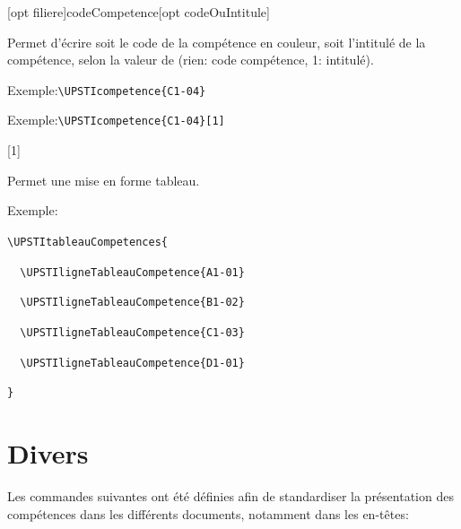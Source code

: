 \documentclass[11pt]{ltxdockit}[2010/09/26]
\newcommand{\ex}{\noindent Exemple:\quad}
\begin{document}
\vspace{1em}
\begin{ltxsyntax}
[opt filiere]{codeCompetence}[opt codeOuIntitule]
\end{ltxsyntax}

\noindent Permet d'écrire soit le code de la compétence en couleur, soit l'intitulé de la compétence, selon la valeur de  (rien: code compétence, 1: intitulé).

\vspace{1em}
\ex\verb!\UPSTIcompetence{C1-04}!

\vspace{1em}



\vspace{1em}
\ex\verb!\UPSTIcompetence{C1-04}[1]!

\vspace{1em}
[1]

\vspace{1em}
\begin{ltxsyntax}
\end{ltxsyntax}

\noindent Permet une mise en forme tableau.

\vspace{1em}
\ex

\verb!\UPSTItableauCompetences{!

\verb!  \UPSTIligneTableauCompetence{A1-01}!

\verb!  \UPSTIligneTableauCompetence{B1-02}!

\verb!  \UPSTIligneTableauCompetence{C1-03}!

\verb!  \UPSTIligneTableauCompetence{D1-01}!

\verb!}!


\vspace{1em}

\section{Divers}
Les commandes suivantes ont été définies afin de standardiser la présentation des compétences dans les différents documents, notamment dans les en-têtes:
\vspace{1em}
\begin{ltxsyntax}
\end{ltxsyntax}
\UPSTIrefProg
\end{document}
